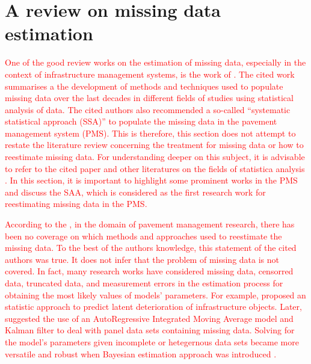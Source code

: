\documentclass[Journal]{ascelike}
\begin{document}
\section{A review on missing data estimation} \label{missingdata}
\textcolor{red}{One of the good review works on the estimation of missing data, especially in the context of infrastructure management systems, is the work of . The cited work summarises a the development of methods and techniques used to populate missing data over the last decades in different fields of studies using statistical analysis of data. The cited authors also recommended a so-called ``systematic statistical approach (SSA)'' to populate the missing data in the pavement management system (PMS). This is therefore, this section does not attempt to restate the literature review concerning the treatment for missing data or how to reestimate missing data. For understanding deeper on this subject, it is advisable to refer to the cited paper and other literatures on the fields of statistica analysis \cite{Little2002,Tsikriktsis2005}. In this section, it is important to highlight some prominent works in the PMS and discuss the SAA, which is considered as the first research work for reestimating missing data in the PMS.}

\textcolor{red}{According to the , in the domain of pavement management research, there has been no coverage on which methods and approaches used to reestimate the missing data. To the best of the authors knowledge, this statement of the cited authors was true. It does not infer that the problem of missing data is not covered. In fact, many research works have considered missing data, censorred data, truncated data, and measurement errors in the estimation process for obtaining the most likely values of models' parameters. For example,  proposed an statistic approach to predict latent deterioration of infrastructure objects. Later,  suggested the use of an AutoRegressive Integrated Moving Average model and Kalman filter to deal with panel data sets containing missing data. Solving for the model's parameters given incomplete or hetegernous data sets became more versatile and robust when Bayesian estimation approach was introduced \cite{Hong2006,Kobayashi2012a,Lethanh2015b}.}
\end{document}
